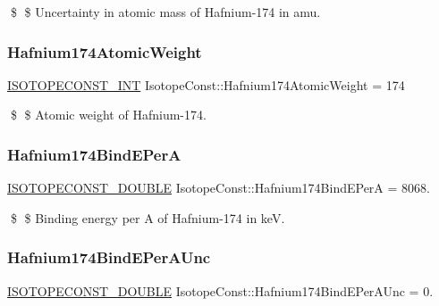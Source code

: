 \$ \$ Uncertainty in atomic mass of Hafnium-\/174 in amu. \mbox{\label{group___isotope_const-_hafnium-_hf174_ga5dcbbe565525ea6746db3c388cdd63f9}} 
\subsubsection{\texorpdfstring{Hafnium174\+Atomic\+Weight}{Hafnium174AtomicWeight}}
{\footnotesize\ttfamily \mbox{\hyperlink{group___isotope_const-_macros_ga5f18360b3e99483a35c32d789e62621c}{I\+S\+O\+T\+O\+P\+E\+C\+O\+N\+S\+T\+\_\+\+I\+NT}} Isotope\+Const\+::\+Hafnium174\+Atomic\+Weight = 174}

\$ \$ Atomic weight of Hafnium-\/174. \mbox{\label{group___isotope_const-_hafnium-_hf174_gabe8579e0d9b9b3f04ca498783c3147bf}} 
\subsubsection{\texorpdfstring{Hafnium174\+Bind\+E\+PerA}{Hafnium174BindEPerA}}
{\footnotesize\ttfamily \mbox{\hyperlink{group___isotope_const-_macros_ga8f45a7272ce02c0b4c65c44636ed719a}{I\+S\+O\+T\+O\+P\+E\+C\+O\+N\+S\+T\+\_\+\+D\+O\+U\+B\+LE}} Isotope\+Const\+::\+Hafnium174\+Bind\+E\+PerA = 8068.}

\$ \$ Binding energy per A of Hafnium-\/174 in keV. \mbox{\label{group___isotope_const-_hafnium-_hf174_gaefaf9d9a6623ee80b4628fa756ca224b}} 
\subsubsection{\texorpdfstring{Hafnium174\+Bind\+E\+Per\+A\+Unc}{Hafnium174BindEPerAUnc}}
{\footnotesize\ttfamily \mbox{\hyperlink{group___isotope_const-_macros_ga8f45a7272ce02c0b4c65c44636ed719a}{I\+S\+O\+T\+O\+P\+E\+C\+O\+N\+S\+T\+\_\+\+D\+O\+U\+B\+LE}} Isotope\+Const\+::\+Hafnium174\+Bind\+E\+Per\+A\+Unc = 0.}

